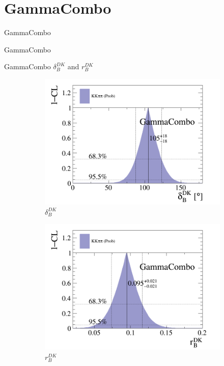 \documentclass{beamer}
\begin{document}
\section{GammaCombo}
\begin{frame}{GammaCombo}
  \begin{center}
    {\huge GammaCombo}
  \end{center}
\end{frame}

\begin{frame}{GammaCombo $\delta_B^{DK}$ and $r_B^{DK}$}
  \begin{figure}[H]
    \centering
    \begin{subfigure}{.5\textwidth}
      \centering
      \includegraphics[width=1\linewidth]{Plots/cartesian_cartesian_d_dk.png}
      \caption{$\delta_B^{DK}$}
    \end{subfigure}%
    \begin{subfigure}{.5\textwidth}
      \centering
      \includegraphics[width=1\linewidth]{Plots/cartesian_cartesian_r_dk.png}
      \caption{$r_B^{DK}$}
    \end{subfigure}
    \caption{}
  \end{figure}
\end{frame}
\end{document}
